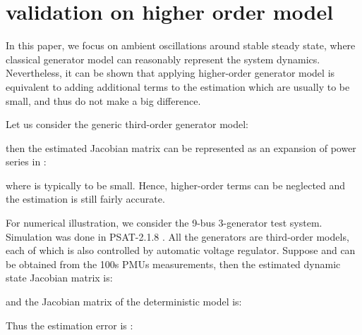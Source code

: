 \documentclass[journal]{IEEEtran}
\begin{document}
\section{validation on higher order model}\label{higherordermodel}
In this paper, we focus on ambient oscillations around stable steady state, where classical generator model can reasonably represent the system dynamics. Nevertheless, it can be shown that applying higher-order generator model is equivalent to adding additional terms to the estimation which are usually to be small, and thus do not make a big difference.

Let us consider the generic third-order generator model:

then the estimated Jacobian matrix can be represented as an expansion of power series in :
\small{

}
\normalsize
where  is typically to be small. Hence, higher-order terms can be neglected and the estimation  is still fairly accurate.

For numerical illustration, we consider the 9-bus 3-generator test system. Simulation was done in PSAT-2.1.8 \cite{Milano:PSAT}. All the generators are third-order models, each of which is also controlled by automatic voltage regulator. Suppose  and  can be obtained from the 100s PMUs measurements, then the estimated dynamic state Jacobian matrix is:

and the Jacobian matrix of the deterministic model is:

Thus the estimation error is :
\end{document}
